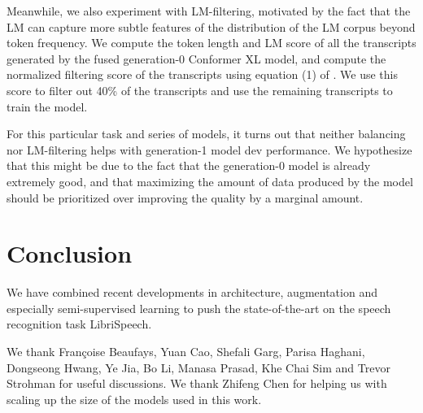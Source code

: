 \documentclass[dvipsnames]{article}
\begin{document}
Meanwhile, we also experiment with LM-filtering, motivated by the fact that the LM can capture more subtle features of the distribution of the LM corpus beyond token frequency. We compute the token length and LM score of all the transcripts generated by the fused generation-0 Conformer XL model, and compute the normalized filtering score of the transcripts using equation (1) of \cite{nstasr}. We use this score to filter out 40\% of the transcripts and use the remaining transcripts to train the model.

For this particular task and series of models, it turns out that neither balancing nor LM-filtering helps with generation-1 model dev performance. We hypothesize that this might be due to the fact that the generation-0 model is already extremely good, and that maximizing the amount of data produced by the model should be prioritized over improving the quality by a marginal amount.

\section{Conclusion}

We have combined recent developments in architecture, augmentation and especially semi-supervised learning to push the state-of-the-art on the speech recognition task LibriSpeech. 

\begin{ack}
We thank Françoise Beaufays, Yuan Cao, Shefali Garg, Parisa Haghani, Dongseong Hwang, Ye Jia, Bo Li, Manasa Prasad, Khe Chai Sim and Trevor Strohman for useful discussions. We thank Zhifeng Chen for helping us with scaling up the size of the models used in this work.
\end{ack}

\small


\end{document}
